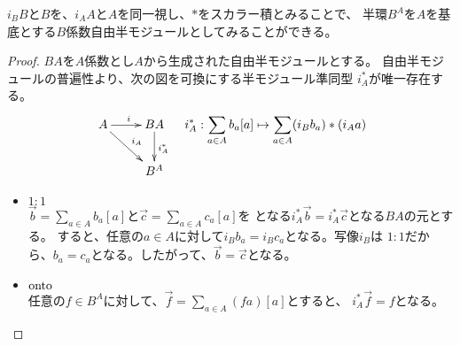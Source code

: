 	$i_BB$と$B$を、$i_AA$と$A$を同一視し、$*$をスカラー積とみることで、
	半環$B^A$を$A$を基底とする$B$係数自由半モジュールとしてみることができる。
	\begin{proof} %
		$BA$を$A$係数とし$A$から生成された自由半モジュールとする。
		自由半モジュールの普遍性より、次の図を可換にする半モジュール準同型
		$i_A^*$が唯一存在する。
		\begin{equation}\xymatrix{
			A \ar[r]^{i} \ar[dr]^{i_A} & BA \ar[d]^{i_A^*} \\
			& B^A \\
		} \quad i_A^*: \sum_{a\in A}b_a[a] \mapsto \sum_{a\in A}(i_Bb_a)*(i_Aa)
		\end{equation}
		\begin{itemize}
			\item $1:1$ \\
			$\vec{b}=\sum_{a\in A}b_a[a]$と$\vec{c}=\sum_{a\in A}c_a[a]$を
			となる$i_A^*\vec{b}=i_A^*\vec{c}$となる$BA$の元とする。
			すると、任意の$a\in A$に対して$i_Bb_a=i_Bc_a$となる。写像$i_B$は
			$1:1$だから、$b_a=c_a$となる。したがって、$\vec{b}=\vec{c}$となる。
			\item $\operatorname{onto}$ \\
			任意の$f\in B^A$に対して、$\vec{f}=\sum_{a\in A}(fa)[a]$とすると、
			$i_A^*\vec{f}=f$となる。
		\end{itemize}
	\end{proof} %

